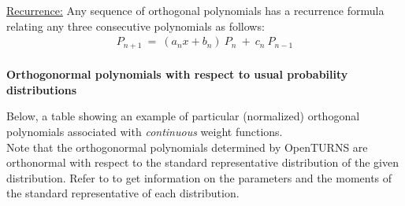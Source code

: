 {  \underline{Recurrence:} Any sequence of orthogonal polynomials has a recurrence formula relating any three consecutive polynomials as follows:
  \begin{align*}
    P_{n+1}\ =\ (a_nx+b_n)\ P_n\ +\ c_n\ P_{n-1}
  \end{align*} \\

  \textbf{Orthogonormal polynomials with respect to usual probability distributions} \vspace{2mm}

  Below, a table showing an example of particular (normalized) orthogonal polynomials associated with \emph{continuous} weight functions.\\
  Note that the orthogonormal polynomials determined by OpenTURNS are orthonormal with respect to the standard representative distribution of the given distribution. Refer to    to get information on the parameters and the moments of the standard representative of each distribution.

  \begin{center}


\end{center}}

